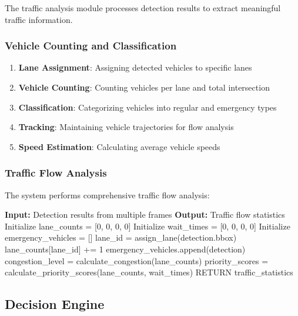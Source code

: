 The traffic analysis module processes detection results to extract meaningful traffic information.

\subsubsection{Vehicle Counting and Classification}

\begin{enumerate}
    \item \textbf{Lane Assignment}: Assigning detected vehicles to specific lanes
    \item \textbf{Vehicle Counting}: Counting vehicles per lane and total intersection
    \item \textbf{Classification}: Categorizing vehicles into regular and emergency types
    \item \textbf{Tracking}: Maintaining vehicle trajectories for flow analysis
    \item \textbf{Speed Estimation}: Calculating average vehicle speeds
\end{enumerate}

\subsubsection{Traffic Flow Analysis}

The system performs comprehensive traffic flow analysis:

\begin{algorithmic}[1]
\STATE \textbf{Input:} Detection results from multiple frames
\STATE \textbf{Output:} Traffic flow statistics
\STATE 
\STATE Initialize lane\_counts = [0, 0, 0, 0]  
\STATE Initialize wait\_times = [0, 0, 0, 0]
\STATE Initialize emergency\_vehicles = []
\STATE 
{}
    \STATE lane\_id = assign\_lane(detection.bbox)
    \STATE lane\_counts[lane\_id] += 1
    \STATE 
        \STATE emergency\_vehicles.append(detection)
    \ENDIF
\ENDFOR
\STATE 
\STATE congestion\_level = calculate\_congestion(lane\_counts)
\STATE priority\_scores = calculate\_priority\_scores(lane\_counts, wait\_times)
\STATE 
\STATE RETURN traffic\_statistics
\end{algorithmic}

\subsection{Decision Engine}

